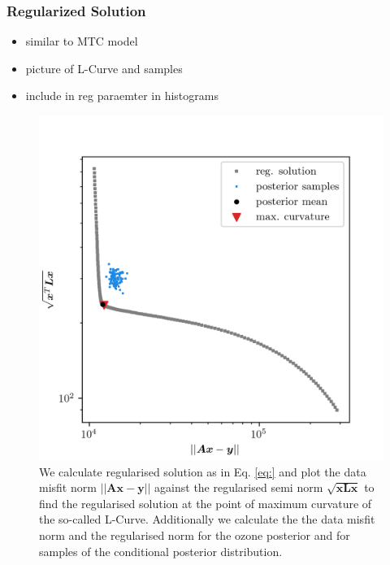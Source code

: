 \subsubsection{Regularized Solution}
\begin{itemize}
	\item similar to MTC model
	\item picture of L-Curve and samples 
	\item include in reg paraemter in histograms
\end{itemize}
\begin{figure}[ht!]
	\centering
	\includegraphics{LCurvePhD.png}
	\caption[Plot of the L-curve to find the regularised solution.]{We calculate regularised solution as in Eq. \ref{eq:} and plot the data misfit norm $||\bm{Ax} -\bm{y} ||$ against the regularised semi norm $\sqrt{\bm{xLx}}$ to find the regularised solution at the point of maximum curvature of the so-called L-Curve. Additionally we calculate the the data misfit norm and the regularised norm for the ozone posterior and for samples of the conditional posterior distribution.}
	\label{fig:LCurve}
\end{figure}

